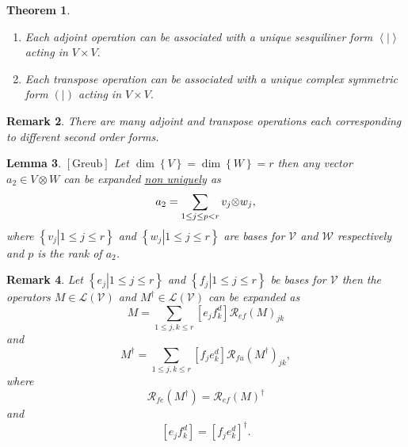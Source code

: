\documentclass[aps,preprint]{revtex4}%
\newtheorem{theorem}{Theorem}
\newtheorem{lemma}[theorem]{Lemma}
\newtheorem{remark}[theorem]{Remark}
\begin{document}
\begin{theorem}
\begin{enumerate}
\item Each adjoint operation can be associated with a \emph{unique sesquiliner
form} $\left\langle \left.  {}\right\vert \right\rangle $ acting in $V\times
V.$

\item Each transpose operation can be associated with a unique complex
symmetric form $\left(  \left.  {}\right\vert \right)  $ acting in $V\times
V.$
\end{enumerate}
\end{theorem}

\begin{remark}
There are many adjoint and transpose operations each corresponding to
different second order forms.
\end{remark}

\begin{lemma}
$\left[  \text{Greub}\right]  $ Let $\dim\left\{  V\right\}  =\dim\left\{
W\right\}  =r$ then any vector $a_{2}\in V\otimes W$ can be expanded
\underline{\emph{non uniquely}} as
\begin{equation}
a_{2}=\sum_{1\leq j\leq p<r}v_{j}{\small \otimes}w_{j},
\end{equation}
where $\left\{  \left.  v_{j}\right\vert 1\leq j\leq r\right\}  $ and
$\left\{  \left.  w_{j}\right\vert 1\leq j\leq r\right\}  $ are bases for
$\mathcal{V}$ and $\mathcal{W}$ respectively and $p$ is the rank of $a_{2}$.
\end{lemma}

\begin{remark}
Let $\left\{  \left.  e_{j}\right\vert 1\leq j\leq r\right\}  $ and $\left\{
\left.  f_{j}\right\vert 1\leq j\leq r\right\}  $ be bases for $\mathcal{V}$
then the operators $M\in\mathcal{L}\left(  \mathcal{V}\right)  $ and
$M^{\dagger}\in\mathcal{L}\left(  \mathcal{V}\right)  $ can be expanded as
\begin{equation}
M=\sum_{1\leq j,k\leq r}\left[  e_{j}f_{k}^{d}\right]  \mathcal{R}_{ef}\left(
M\right)  _{jk}%
\end{equation}
and
\begin{equation}
M^{\dagger}=\sum_{1\leq j,k\leq r}\left[  f_{j}e_{k}^{d}\right]
\mathcal{R}_{fu}\left(  M^{\dagger}\right)  _{jk},
\end{equation}
where
\begin{equation}
\mathcal{R}_{fe}\left(  M^{\dagger}\right)  =\mathcal{R}_{ef}\left(  M\right)
^{\dagger}%
\end{equation}
and
\begin{equation}
\left[  e_{j}f_{k}^{d}\right]  =\left[  f_{j}e_{k}^{d}\right]  ^{\dagger}.
\end{equation}

\end{remark}
\end{document}
